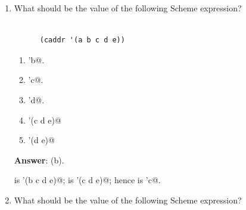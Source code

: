 \documentclass[12pt]{article}
\begin{document}
\begin{enumerate}
\begin{enumerate}
\item \verb@cons@ constructs a list, \verb@car@ returns the tail
of the list, \verb@cdr@ returns the head of the list.

\item \verb@cons@ constructs a pair, \verb@car@ returns the first
element of the pair, \verb@cdr@ returns the second element of the pair.

\item \verb@cons@ constructs a list, \verb@car@ returns the first
 element of the list and \verb@cdr@ returns the second element of the
 list.

\item \verb@cons@ constructs a pair, \verb@car@ returns the second
element of the pair, \verb@cdr@ returns the first element of the pair.


\end{enumerate}

\textbf{Answer}: (c).

\verb@cons@ constructs a pair, not a list (which is constructed by
\verb@list@); \verb@car@ accesses the first element of the pair
and \verb@cdr@ the second.

\item What should be the value of the following Scheme expression?

\begin{verbatim}

      (caddr '(a b c d e))

\end{verbatim}

\begin{enumerate}

  \item \verb@'b@.

  \item \verb@'c@.
    
  \item \verb@'d@.

  \item \verb@'(c d e)@

  \item \verb@'(d e)@
    
    
\end{enumerate}

\textbf{Answer}: (b).

\verb@cdr@ is \verb@'(b c d e)@; \verb@cddr@ is \verb@'(c d e)@; hence
\verb@caddr@ is \verb@'c@.


\item What should be the value of the following Scheme expression?


\end{enumerate}
\end{document}
